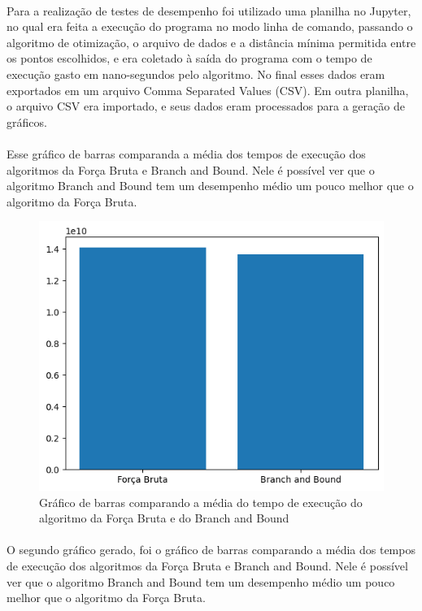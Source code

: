 \documentclass[12pt]{article}
\begin{document}
\paragraph{}Para a realização de testes de desempenho foi utilizado uma planilha no Jupyter, no qual era feita a execução do programa no modo linha de comando, passando o algoritmo de otimização, o arquivo de dados e a distância mínima permitida entre os pontos escolhidos, e era coletado à saída do programa com o tempo de execução gasto em nano-segundos pelo algoritmo. No final esses dados eram exportados em um arquivo Comma Separated Values (CSV). Em outra planilha, o arquivo CSV era importado, e seus dados eram processados para a geração de gráficos.

\paragraph{}Esse gráfico de barras comparanda a média dos tempos de execução dos algoritmos da Força Bruta e Branch and Bound. Nele é possível ver que o algoritmo Branch and Bound tem um desempenho médio um pouco melhor que o algoritmo da Força Bruta.

\begin{figure}
    \centering
    \includegraphics{comparacao.png}
    \caption{Gráfico de barras comparando a média do tempo de execução do algoritmo da Força Bruta e do Branch and Bound}
    \label{fig:fig-9}
\end{figure}


\paragraph{}O segundo gráfico gerado, foi o gráfico de barras comparando a média dos tempos de execução dos algoritmos da Força Bruta e Branch and Bound. Nele é possível ver que o algoritmo Branch and Bound tem um desempenho médio um pouco melhor que o algoritmo da Força Bruta.
\end{document}
